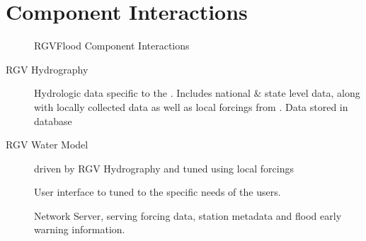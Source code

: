 \documentclass[letterpaper,10pt,english]{sphinxmanual}
\begin{document}
\section{Component Interactions}
\label{\detokenize{predevelopment/component-interactions/index:component-interactions}}\label{\detokenize{predevelopment/component-interactions/index::doc}}
\begin{figure}[htbp]
\centering
\capstart

\noindent{}
\caption{RGVFlood Component Interactions}\label{\detokenize{predevelopment/component-interactions/index:id1}}\end{figure}
\begin{description}
\item[{RGV Hydrography}] \leavevmode
\sphinxAtStartPar
Hydrologic data specific to the {\hyperref[\detokenize{glossary:term-LRGV}]{}}. Includes national \& state level data, along with locally collected data as well as local forcings from {\hyperref[\detokenize{glossary:term-RTHS.us}]{}}. Data stored in {\hyperref[\detokenize{glossary:term-REON}]{}} {\hyperref[\detokenize{glossary:term-PostgreSQL}]{}} database

\item[{RGV Water Model}] \leavevmode
\sphinxAtStartPar
{\hyperref[\detokenize{glossary:term-REON-WM}]{}} driven by RGV Hydrography and tuned using local forcings

\item[{{\hyperref[\detokenize{glossary:term-RGVFlood.com}]{}}}] \leavevmode
\sphinxAtStartPar
User interface to {\hyperref[\detokenize{glossary:term-REON.cc}]{}} tuned to the specific needs of the {\hyperref[\detokenize{glossary:term-LRGV}]{}} users.

\item[{{\hyperref[\detokenize{glossary:term-RTHS.us}]{}}}] \leavevmode
\sphinxAtStartPar
{\hyperref[\detokenize{glossary:term-RTHS}]{}} Network Server, serving forcing data, station metadata and flood early warning information.


\end{description}
\end{document}
